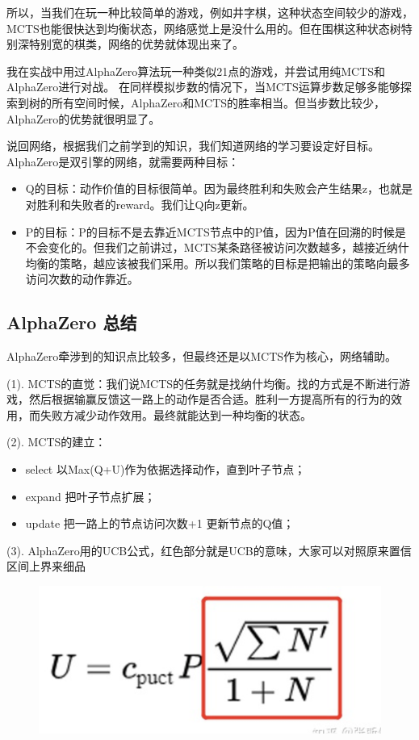\documentclass[12pt]{article}
\begin{document}
\begin{framed}
所以，当我们在玩一种比较简单的游戏，例如井字棋，这种状态空间较少的游戏，MCTS也能很快达到均衡状态，网络感觉上是没什么用的。但在围棋这种状态树特别深特别宽的棋类，网络的优势就体现出来了。

我在实战中用过AlphaZero算法玩一种类似21点的游戏，并尝试用纯MCTS和AlphaZero进行对战。 在同样模拟步数的情况下，当MCTS运算步数足够多能够探索到树的所有空间时候，AlphaZero和MCTS的胜率相当。但当步数比较少，AlphaZero的优势就很明显了。

说回网络，根据我们之前学到的知识，我们知道网络的学习要设定好目标。AlphaZero是双引擎的网络，就需要两种目标：
\begin{itemize}
\setlength{\itemsep}{0pt}
\setlength{\parsep}{0pt}
\setlength{\parskip}{0pt}
    \item Q的目标：动作价值的目标很简单。因为最终胜利和失败会产生结果z，也就是对胜利和失败者的reward。我们让Q向z更新。
    \item P的目标：P的目标不是去靠近MCTS节点中的P值，因为P值在回溯的时候是不会变化的。但我们之前讲过，MCTS某条路径被访问次数越多，越接近纳什均衡的策略，越应该被我们采用。所以我们策略的目标是把输出的策略向最多访问次数的动作靠近。
\end{itemize}
\end{framed}

\subsection{AlphaZero 总结}
AlphaZero牵涉到的知识点比较多，但最终还是以MCTS作为核心，网络辅助。

(1). MCTS的直觉：我们说MCTS的任务就是找纳什均衡。找的方式是不断进行游戏，然后根据输赢反馈这一路上的动作是否合适。胜利一方提高所有的行为的效用，而失败方减少动作效用。最终就能达到一种均衡的状态。

(2). MCTS的建立：
\begin{itemize}
\setlength{\itemsep}{0pt}
\setlength{\parsep}{0pt}
\setlength{\parskip}{0pt}
    \item select 以Max(Q+U)作为依据选择动作，直到叶子节点；
    \item expand 把叶子节点扩展；
    \item update 把一路上的节点访问次数+1 更新节点的Q值；
\end{itemize}

(3). AlphaZero用的UCB公式，红色部分就是UCB的意味，大家可以对照原来置信区间上界来细品
\begin{figure}[H]
    \centering
    \includegraphics[width=.4\textwidth]{fig/ReinforcementLearning/AlphaZero_MCTS_Eq_1.png}
\end{figure}
\end{document}

